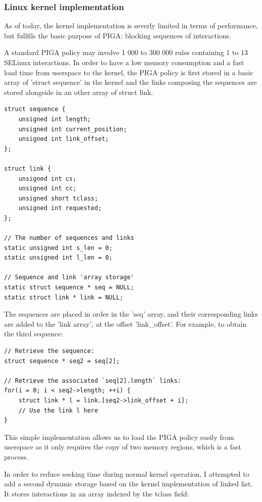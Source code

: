 \documentclass[pdftex,a4paper,titlepage,11pt]{article}
\begin{document}
\subsubsection{Linux kernel implementation}

As of today, the kernel implementation is severly limited in terms of
performance, but fullfils the basic purpose of PIGA: blocking sequences of
interactions.

\bigskip

A standard PIGA policy may involve 1 000 to 300 000 rules containing 1 to 13
SELinux interactions. In order to have a low memory consumption and a fast
load time from userspace to the kernel, the PIGA policy is first stored in a
basic array of 'struct sequence' in the kernel and the links composing the
sequences are stored alongside in an other array of struct link.

\begin{lstlisting}
struct sequence {
	unsigned int length;
	unsigned int current_position;
	unsigned int link_offset;
};

struct link {
	unsigned int cs;
	unsigned int cc;
	unsigned short tclass;
	unsigned int requested;
};

// The number of sequences and links
static unsigned int s_len = 0;
static unsigned int l_len = 0;

// Sequence and link 'array storage'
static struct sequence * seq = NULL;
static struct link * link = NULL;
\end{lstlisting}

\medskip

The sequences are placed in order in the 'seq' array, and their corresponding
links are added to the 'link array', at the offset 'link\_offset'. For example,
to obtain the third sequence:

\begin{lstlisting}
// Retrieve the sequence:
struct sequence * seq2 = seq[2];

// Retrieve the associated `seq[2].length` links:
for(i = 0; i < seq2->length; ++i) {
	struct link * l = link.[seq2->link_offset + i];
	// Use the link l here
}
\end{lstlisting}

\medskip

This simple implementation allows us to load the PIGA policy easily from
userspace as it only requires the copy of two memory regions, which is a fast
process.

\bigskip

In order to reduce seeking time during normal kernel operation, I attempted to
add a second dynamic storage based on the kernel implementation of linked list.
It stores interactions in an array indexed by the tclass field:
\end{document}
